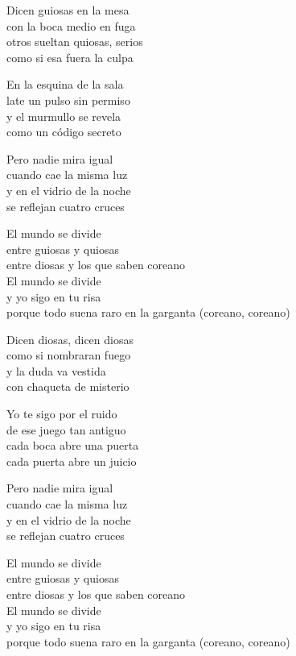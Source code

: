 \begin{lyrics}
Dicen guiosas en la mesa\\
con la boca medio en fuga\\
otros sueltan quiosas, serios\\
como si esa fuera la culpa

En la esquina de la sala\\
late un pulso sin permiso\\
y el murmullo se revela\\
como un código secreto

Pero nadie mira igual\\
cuando cae la misma luz\\
y en el vidrio de la noche\\
se reflejan cuatro cruces

El mundo se divide\\
entre guiosas y quiosas\\
entre diosas y los que saben coreano\\
El mundo se divide\\
y yo sigo en tu risa\\
porque todo suena raro en la garganta
(coreano, coreano)

Dicen diosas, dicen diosas\\
como si nombraran fuego\\
y la duda va vestida\\
con chaqueta de misterio

Yo te sigo por el ruido\\
de ese juego tan antiguo\\
cada boca abre una puerta\\
cada puerta abre un juicio

Pero nadie mira igual\\
cuando cae la misma luz\\
y en el vidrio de la noche\\
se reflejan cuatro cruces

El mundo se divide\\
entre guiosas y quiosas\\
entre diosas y los que saben coreano\\
El mundo se divide\\
y yo sigo en tu risa\\
porque todo suena raro en la garganta
(coreano, coreano)


\end{lyrics}
